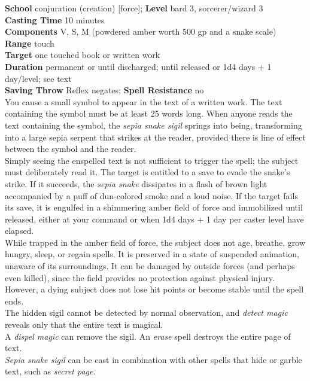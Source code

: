\textbf{School} conjuration (creation) [force]; \textbf{Level} bard 3, sorcerer/wizard 3\\
\textbf{Casting Time} 10 minutes\\
\textbf{Components} V, S, M (powdered amber worth 500 gp and a snake scale)\\
\textbf{Range} touch\\
\textbf{Target} one touched book or written work\\
\textbf{Duration} permanent or until discharged; until released or 1d4 days + 1 day/level; see text\\
\textbf{Saving Throw} Reflex negates; \textbf{Spell Resistance} no\\
You cause a small symbol to appear in the text of a written work. The text containing the symbol must be at least 25 words long. When anyone reads the text containing the symbol, the \textit{sepia snake sigil }springs into being, transforming into a large sepia serpent that strikes at the reader, provided there is line of effect between the symbol and the reader.\\
Simply seeing the enspelled text is not sufficient to trigger the spell; the subject must deliberately read it. The target is entitled to a save to evade the snake's strike. If it succeeds, the \textit{sepia snake }dissipates in a flash of brown light accompanied by a puff of dun-colored smoke and a loud noise. If the target fails its save, it is engulfed in a shimmering amber field of force and immobilized until released, either at your command or when 1d4 days + 1 day per caster level have elapsed.\\
While trapped in the amber field of force, the subject does not age, breathe, grow hungry, sleep, or regain spells. It is preserved in a state of suspended animation, unaware of its surroundings. It can be damaged by outside forces (and perhaps even killed), since the field provides no protection against physical injury. However, a dying subject does not lose hit points or become stable until the spell ends.\\
The hidden sigil cannot be detected by normal observation, and \textit{detect magic }reveals only that the entire text is magical.\\
A \textit{dispel magic }can remove the sigil. An \textit{erase }spell destroys the entire page of text.\\
\textit{Sepia snake sigil }can be cast in combination with other spells that hide or garble text, such as \textit{secret page.}\\
